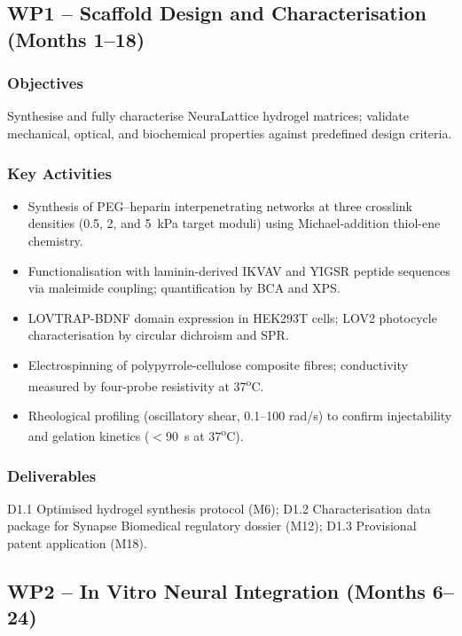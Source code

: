 \documentclass[11pt,a4paper]{article}
\begin{document}
\par
\vspace{8pt}

\subsection{WP1 -- Scaffold Design and Characterisation (Months 1--18)}

\subsubsection{Objectives}
Synthesise and fully characterise NeuraLattice hydrogel matrices; validate mechanical,
optical, and biochemical properties against predefined design criteria.

\subsubsection{Key Activities}
\begin{itemize}
  \item Synthesis of PEG--heparin interpenetrating networks at three crosslink densities
    (0.5, 2, and 5~kPa target moduli) using Michael-addition thiol-ene chemistry.
  \item Functionalisation with laminin-derived IKVAV and YIGSR peptide sequences via
    maleimide coupling; quantification by BCA and XPS.
  \item LOVTRAP-BDNF domain expression in HEK293T cells; LOV2 photocycle
    characterisation by circular dichroism and SPR.
  \item Electrospinning of polypyrrole-cellulose composite fibres; conductivity measured
    by four-probe resistivity at 37\textsuperscript{o}C.
  \item Rheological profiling (oscillatory shear, 0.1--100 rad/s) to confirm injectability
    and gelation kinetics (\(<\)90~s at 37\textsuperscript{o}C).
\end{itemize}

\subsubsection{Deliverables}
D1.1 Optimised hydrogel synthesis protocol (M6); D1.2 Characterisation data package for
Synapse Biomedical regulatory dossier (M12); D1.3 Provisional patent application
(M18).

\subsection{WP2 -- In Vitro Neural Integration (Months 6--24)}
\end{document}
